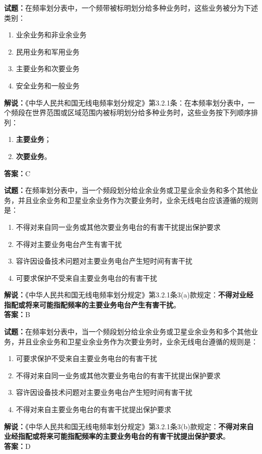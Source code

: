 \documentclass{ctexbook}
\begin{document}
\vspace{\baselineskip}

\noindent\textbf{试题：}在频率划分表中，一个频带被标明划分给多种业务时，这些业务被分为下述类别：
\begin{enumerate}[leftmargin=3em]
  \item 业余业务和非业余业务
  \item 民用业务和军用业务
  \item 主要业务和次要业务
  \item 安全业务和一般业务
\end{enumerate}
\noindent\textbf{解说：}《中华人民共和国无线电频率划分规定》第3.2.1条：在本频率划分表中，一个频段在世界范围或区域范围内被标明划分给多种业务时，这些业务按下列顺序排列：
\begin{enumerate}[leftmargin=3em, label=\alph*)]
  \item \textbf{主要业务}；
  \item \textbf{次要业务}。
\end{enumerate}
\textbf{答案：}C

\vspace{\baselineskip}

\noindent\textbf{试题：}在频率划分表中，当一个频段划分给业余业务或卫星业余业务和多个其他业务，并且业余业务和卫星业余业务作为次要业务时，业余无线电台应该遵循的规则是：
\begin{enumerate}[leftmargin=3em]
  \item 不得对来自同一业务或其他次要业务电台的有害干扰提出保护要求
  \item 不得对主要业务电台产生有害干扰
  \item 容许因设备技术问题对主要业务电台产生短时间有害干扰
  \item 可要求保护不受来自主要业务电台的有害干扰
\end{enumerate}
\noindent\textbf{解说：}《中华人民共和国无线电频率划分规定》第3.2.1条3(a)款规定：\textbf{不得对业经指配或将来可能指配频率的主要业务电台产生有害干扰}。\\
\textbf{答案：}B

\vspace{\baselineskip}

\noindent\textbf{试题：}在频率划分表中，当一个频段划分给业余业务或卫星业余业务和多个其他业务，并且业余业务和卫星业余业务作为次要业务时，业余无线电台遵循的规则是：
\begin{enumerate}[leftmargin=3em]
  \item 可要求保护不受来自主要业务电台的有害干扰
  \item 不得对来自同一业务或其他次要业务电台的有害干扰提出保护要求
  \item 容许因设备技术问题对主要业务电台产生短时间有害干扰
  \item 不得对来自主要业务电台的有害干扰提出保护要求
\end{enumerate}
\noindent\textbf{解说：}《中华人民共和国无线电频率划分规定》第3.2.1条3(b)款规定：\textbf{不得对来自业经指配或将来可能指配频率的主要业务电台的有害干扰提出保护要求}。\\\textbf{答案：}D
\end{document}
